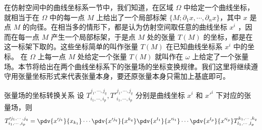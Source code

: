 
在仿射空间中的曲线坐标系一节中，我们知道，在区域 $\Omega$ 中给定一个曲线坐标，就相当于在 $\Omega$ 中的每一点 $M$ 上给出了一个局部标架 $\{M;\partial_1 x,\cdots,\partial_n x\}$，其中 $x$ 是点 $M$ 的向径。在相当多的情形下，都是认为仿射空间取任意的曲线坐标 $x^i$ ，因而在每一点 $M$ 产生一个局部标架，于是点 $M$ 处的张量 $T(M)$ 的坐标，都是在这一标架下取的。这些坐标简单的叫作张量 $T(M)$ 在已知曲线坐标系 $x^i$ 中的坐标。 在 $\Omega$ 上每一点 $M$ 处给定一个张量 $T(M)$ 就叫作在 $\omega$ 上给定了一个张量场。本节将给出在两个曲线坐标系下的张量场的坐标变换规律。我们这里将继续遵守用张量坐标形式来代表张量本身，要还原张量本身只需加上基底即可。

\begin{theorem}{张量场的坐标转换关系}
设 $T^{j_1,\cdots,j_q}_{i_1,\cdots,i_p},T'^{j_1,\cdots,j_q}_{i_1,\cdots,i_p}$ 分别是曲线坐标 $x^i$ 和 $x'^i$ 下对应的张量场，则
\begin{equation}
T'^{j_1,\cdots,j_q}_{i_1,\cdots,i_p}=\pdv{x'^{j_1}}{x_{k_1}}\cdots \pdv{x'^{j_q}}{x^{k_q}}\pdv{x^{l_1}}{x'^{i_1}}\cdots \pdv{x^{l_p}}{x'^{i_p}}T^{k_1,\cdots,k_q}_{l_1,\cdots,l_p}
\end{equation}
 
\end{theorem}
